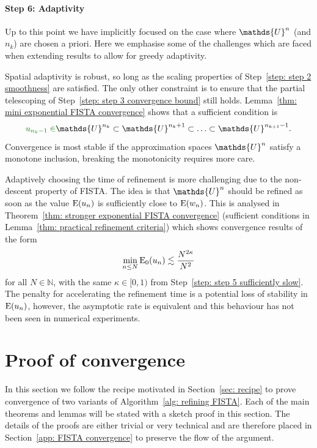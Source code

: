 \documentclass[smallextended]{svjour3}
\let\F\mathds\let\C\mathcal\newcommand{\R}{\F{R}}\newcommand{\A}{\tens{A}}
\newcommand{\op}[1]{\operatorname{#1}}
\newcommand{\1}{\F{1}}
\newcounter{adaptStepCounter}
\newenvironment{adaptiveStep}{\refstepcounter{adaptStepCounter}}{}
\newcommand*{\varf}[1]{%
	\IfEqCase{#1}{%
		{0}{u}%
		{1}{v}%
		{2}{w}%
	}[u#1]%
}
\newcommand*{\spcf}[1]{%
	\IfEqCase{#1}{%
		{0}{\F{U}}%
		{1}{\F{V}}%
		{2}{\F{W}}%
	}[\F{U}#1]%
}
\newcommand{\edit}[2]{{\ifmmode\text{\color{red}\sout{\ensuremath{#1}}}\else {\color{red} \sout{#1}}\fi} {\color{darkgreen} #2}}
\begin{document}
	\paragraph{Step 6: Adaptivity}
	\begin{adaptiveStep}\label{step: step 6 adaptivity}
		Up to this point we have implicitly focused on the case where $\spcf0^n$ (and $n_k$) are chosen a priori. Here we emphasise some of the challenges which are faced when extending results to allow for greedy adaptivity.
		
		Spatial adaptivity is robust, so long as the scaling properties of Step~\ref{step: step 2 smoothness} are satisfied. The only other constraint is to ensure that the partial telescoping of Step~\ref{step: step 3 convergence bound} still holds. Lemma~\ref{thm: mini exponential FISTA convergence} shows that a sufficient condition is
		$$\edit{}{\varf0_{n_k-1}\in}\spcf0^{n_k}\subset\spcf0^{n_k+1}\subset\ldots\subset\spcf0^{n_{k+1}-1}.$$
		Convergence is most stable if the approximation spaces $\spcf0^n$ satisfy a monotone inclusion, breaking the monotonicity requires more care.
		
		Adaptively choosing the time of refinement is more challenging due to the non-descent property of FISTA. The idea is that $\spcf0^n$ should be refined as soon as the value $\op{E}(\varf0_n)$ is sufficiently close to $\op{E}(\varf2_n)$. This is analysed in Theorem~\ref{thm: stronger exponential FISTA convergence} (sufficient conditions in Lemma~\ref{thm: practical refinement criteria}) which shows convergence results of the form
		$$ \min_{n\leq N}\op{E}_0(\varf0_n) \lesssim \frac{N^{2\kappa}}{N^2}$$
		for all $N\in\F N$, with the same $\kappa\in[0,1)$ from Step~\ref{step: step 5 sufficiently slow}. The penalty for accelerating the refinement time is a potential loss of stability in $\op{E}(\varf0_n)$, however, the asymptotic rate is equivalent and this behaviour has not been seen in numerical experiments.
	\end{adaptiveStep}
	
	\section{Proof of convergence}\label{sec: FISTA convergence}
	In this section we follow the recipe motivated in Section~\ref{sec: recipe} to prove convergence of two variants of Algorithm~\ref{alg: refining FISTA}. Each of the main theorems and lemmas will be stated with a sketch proof in this section. The details of the proofs are either trivial or very technical and are therefore placed in Section~\ref{app: FISTA convergence} to preserve the flow of the argument.
	
\end{document}
